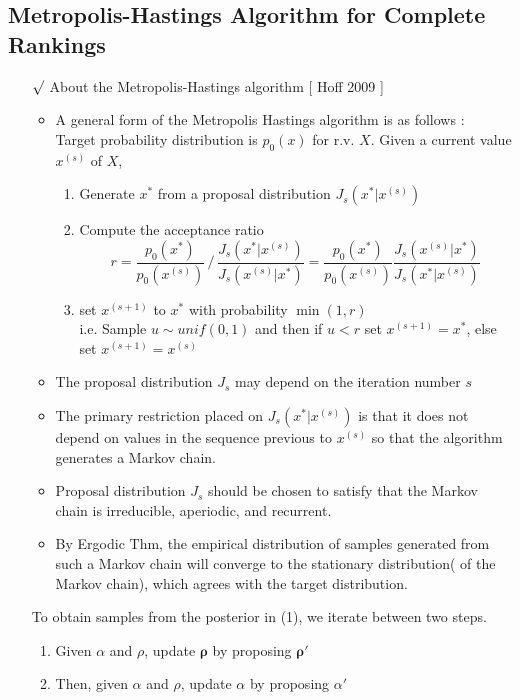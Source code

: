 \documentclass[12pt]{article}
\newcommand{\rmk}{$\surd$}
\begin{document}
\subsection{Metropolis-Hastings Algorithm for Complete Rankings}
\begin{itemize}
    \item[\rmk] About the Metropolis-Hastings algorithm [ Hoff 2009 ]
    \begin{itemize}
        \item A general form of the Metropolis Hastings algorithm is as follows : \\ Target probability distribution is $p_0(x)$ for r.v. $X$. Given a current value $x^{(s)}$ of $X$, 
        \begin{enumerate}
            \item Generate $x^{*}$ from a proposal distribution $J_s(x^{*}|x^{(s)})$
            \item Compute the acceptance ratio $$ r=\frac{p_0(x^*)}{p_0(x^{(s)})}\, /\, \frac{J_s(x^*|x^{(s)})}{J_s(x^{(s)}|x^*)} = \frac{p_0(x^*)}{p_0(x^{(s)})}\frac{J_s(x^{(s)}|x^*)}{J_s(x^*|x^{(s)})} $$
            \item set $x^{(s+1)}$ to $x^*$ with probability $\min (1, r)$ \\ i.e. Sample $u\sim unif(0,1)$ and then if $u<r$ set $x^{(s+1)}=x^*$, else set $x^{(s+1)}=x^{(s)}$
        \end{enumerate}
        \item The proposal distribution $J_s$ may depend on the iteration number $s$
        \item The primary restriction placed on $J_s(x^*|x^{(s)})$ is that it does not depend on values in the sequence previous to $x^{(s)}$ so that the algorithm generates a Markov chain.
        \item Proposal distribution $J_s$ should be chosen to satisfy that the Markov chain is irreducible, aperiodic, and recurrent. 
        \item By Ergodic Thm, the empirical distribution of samples generated from such a Markov chain will converge to the stationary distribution( of the Markov chain), which agrees with the target distribution.
    \end{itemize}
    To obtain samples from the posterior in (1), we iterate between two steps.
    \begin{enumerate}
        \item Given $\alpha$ and $\rho$, update $\boldsymbol{\rho}$ by proposing $\boldsymbol{\rho}'$
        \item Then, given $\alpha$ and $\rho$, update $\alpha$ by proposing $\alpha'$

\end{enumerate}
\end{itemize}
\end{document}
